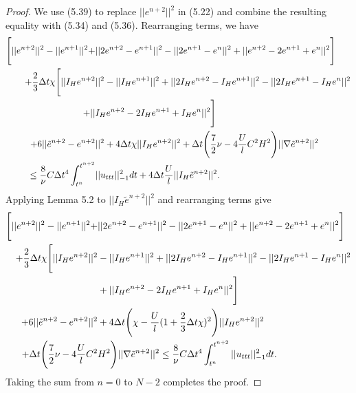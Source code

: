 \documentclass[10pt,a4paper]{amsart}
\begin{document}
\begin{proof}
    We use (5.39) to replace $||e^{n+2}||^2$ in (5.22) and combine the resulting equality with (5.34) and (5.36). Rearranging terms, we have
    \begin{align}
        \Bigg[||e^{n+2}||^2-||e^{n+1}||^2+&||2e^{n+2}-e^{n+1}||^2-||2e^{n+1}-e^n||^2+||e^{n+2}-2e^{n+1}+e^n||^2\Bigg] \notag  \\
        +\frac{2}{3}\Delta t\chi \Bigg[||I_He^{n+2}&||^2 - ||I_He^{n+1}||^2 + ||2I_He^{n+2}-I_He^{n+1}||^2 - ||2I_He^{n+1}-I_He^n||^2 \notag \\
        +||&I_He^{n+2}-2I_He^{n+1}+I_He^n||^2\Bigg]  \\
        +6||\Tilde{e}^{n+2}-e^{n+2}&||^2 +4\Delta t\chi ||I_He^{n+2}||^2 +\Delta t\Bigg(\frac{7}{2}\nu -4\frac{U}{l}C^2H^2\Bigg) ||\nabla \Tilde{e}^{n+2}||^2 \notag \\
        \leq \frac{8}{\nu}C\Delta t^4\int_{t^n}^{t^{n+2}}&||u_{ttt}||_{-1}^2dt + 4\Delta t\frac{U}{l}||I_H\tilde{e}^{n+2}||^2. \notag
    \end{align}
    Applying Lemma 5.2 to $||I_H\tilde{e}^{n+2}||^2$ and rearranging terms give
    \begin{align}
        \Bigg[||e^{n+2}||^2-||e^{n+1}||^2+&||2e^{n+2}-e^{n+1}||^2-||2e^{n+1}-e^n||^2+||e^{n+2}-2e^{n+1}+e^n||^2\Bigg] \notag  \\
        +\frac{2}{3}\Delta t\chi \Bigg[ ||I_He^{n+2}||^2& - ||I_He^{n+1}||^2 + ||2I_He^{n+2}-I_He^{n+1}||^2 - ||2I_He^{n+1}-I_He^n||^2 \notag \\
        &+||I_He^{n+2}-2I_He^{n+1}+I_He^n||^2\Bigg]  \\
        +6||\Tilde{e}^{n+2}-e^{n+2}||^2 &+4\Delta t\Bigg(\chi-\frac{U}{l}(1+\frac{2}{3}\Delta t \chi)^2\Bigg)||I_He^{n+2}||^2 \notag \\
        +\Delta t\Bigg(\frac{7}{2}\nu -4\frac{U}{l}C^2&H^2\Bigg) ||\nabla \Tilde{e}^{n+2}||^2 \leq \frac{8}{\nu}C\Delta t^4\int_{t^n}^{t^{n+2}}||u_{ttt}||_{-1}^2dt. \notag
    \end{align}
    Taking the sum from $n = 0$ to $N-2$ completes the proof.
\end{proof}
\end{document}
